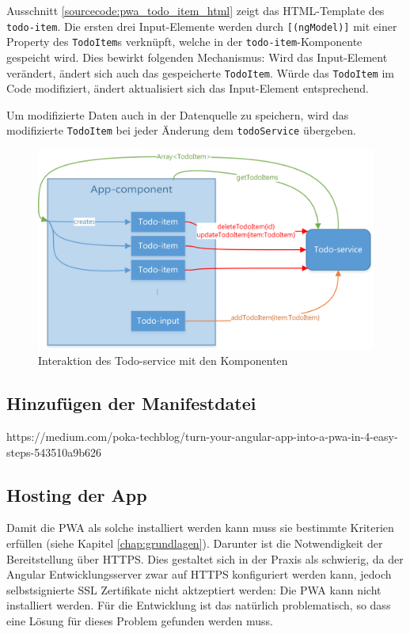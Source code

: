 \begin{description}
	Ausschnitt \ref{sourcecode:pwa_todo_item_html} zeigt das HTML-Template des \texttt{todo-item}. Die ersten drei Input-Elemente werden durch \texttt{[(ngModel)]} mit einer Property des \texttt{TodoItem}s verknüpft, welche in der \texttt{todo-item}-Komponente gespeicht wird. Dies bewirkt folgenden Mechanismus: Wird das Input-Element verändert, ändert sich auch das gespeicherte \texttt{TodoItem}. Würde das \texttt{TodoItem} im Code modifiziert, ändert aktualisiert sich das Input-Element entsprechend.
	
	Um modifizierte Daten auch in der Datenquelle zu speichern, wird das modifizierte \texttt{TodoItem} bei jeder Änderung dem \texttt{todoService} übergeben.
	
\end{description}

\begin{figure}[h]
	\includegraphics[width=\textwidth]{img/pwa_components.png}
	\centering
	\caption{Interaktion des Todo-service mit den Komponenten}
	\label{fig:pwa_todo_service}
\end{figure}


\subsection{Hinzufügen der Manifestdatei}
https://medium.com/poka-techblog/turn-your-angular-app-into-a-pwa-in-4-easy-steps-543510a9b626


\subsection{Hosting der App}
Damit die PWA als solche installiert werden kann muss sie bestimmte Kriterien erfüllen (siehe Kapitel \ref{chap:grundlagen}). Darunter ist die Notwendigkeit der Bereitstellung über HTTPS. Dies gestaltet sich in der Praxis als schwierig, da der Angular Entwicklungsserver zwar auf HTTPS konfiguriert werden kann, jedoch selbstsignierte SSL Zertifikate nicht aktzeptiert werden: Die PWA kann nicht installiert werden. Für die Entwicklung ist das natürlich problematisch, so dass eine Lösung für dieses Problem gefunden werden muss.

